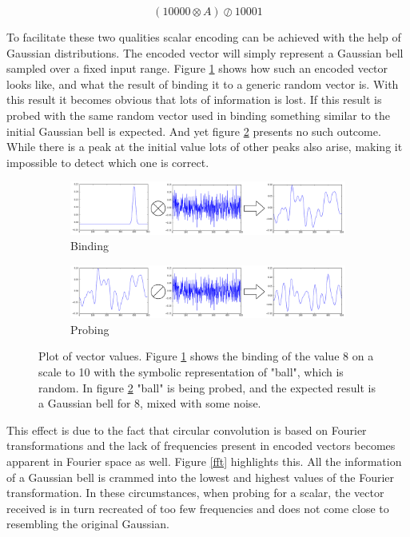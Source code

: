 \documentclass[conference]{IEEEtran}
\begin{document}
	\begin{equation}
	(10000 \otimes A) \oslash 10001
	\end{equation}
	
	To facilitate these two qualities scalar encoding can be achieved with the help of Gaussian distributions.
The encoded vector will simply represent a Gaussian bell sampled over a fixed input range.
Figure \ref{no-perm-a} shows how such an encoded vector looks like, and what the result of binding it to a generic random vector is.
With this result it becomes obvious that lots of information is lost.
If this result is probed with the same random vector used in binding something similar to the initial Gaussian bell is expected.
And yet figure \ref{no-perm-b} presents no such outcome.
While there is a peak at the initial value lots of other peaks also arise, making it impossible to detect which one is correct.

	
	\begin{figure}
		\begin{subfigure}{1\columnwidth}
			\includegraphics[width=\columnwidth]{img/scalar-pre-perm.png}
			\caption{Binding}
			\label{no-perm-a}
		\end{subfigure}
		\begin{subfigure}{1\columnwidth}
			\includegraphics[width=\columnwidth]{img/scalar-pre-perm-probe.png}
			\caption{Probing}
			\label{no-perm-b}
		\end{subfigure}
		\caption{Plot of vector values.
Figure \ref{no-perm-a} shows the binding of the value 8 on a scale to 10 with the symbolic representation of "ball", which is random.
In figure \ref{no-perm-b} "ball" is being probed, and the expected result is a Gaussian bell for 8, mixed with some noise.}
		\label{no-perm}
	\end{figure}
	
	This effect is due to the fact that circular convolution is based on Fourier transformations and the lack of frequencies present in encoded vectors becomes apparent in Fourier space as well.
Figure \ref{fft} highlights this.
All the information of a Gaussian bell is crammed into the lowest and highest values of the Fourier transformation.
In these circumstances, when probing for a scalar, the vector received is in turn recreated of too few frequencies and does not come close to resembling the original Gaussian.
\end{document}
